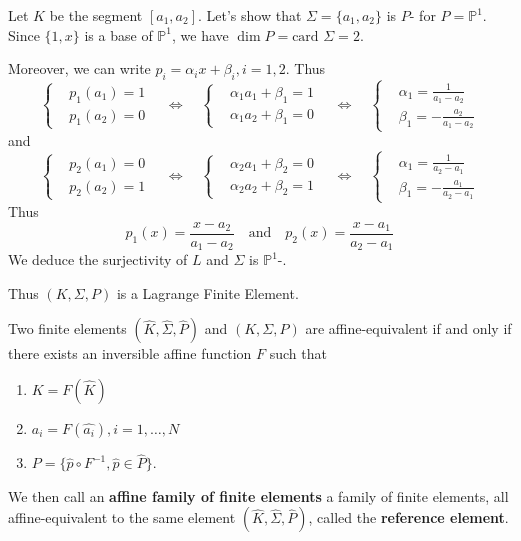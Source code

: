 \begin{Example}
	Let $K$ be the segment $[a_1,a_2]$. Let's show that $\Sigma=\{a_1,a_2\}$ is $P$- for $P=\mathbb{P}^1$. Since $\{1,x\}$ is a base of $\mathbb{P}^1$, we have $\dim P = \text{card } \Sigma = 2$. 
	
	Moreover, we can write $p_i=\alpha_i x+\beta_i, i=1,2$. Thus
	\begin{equation*}
		\left\{\begin{aligned}
			&p_1(a_1)=1 \\
			&p_1(a_2)=0
		\end{aligned}\right. \quad \iff	\quad
		\left\{\begin{aligned}
			&\alpha_1 a_1+\beta_1=1 \\
			&\alpha_1 a_2+\beta_1=0
		\end{aligned}\right. \quad \iff \quad
		\left\{\begin{aligned}
		&\alpha_1 = \frac{1}{a_1-a_2} \\
		&\beta_1 = -\frac{a_2}{a_1-a_2}
	\end{aligned}\right.
	\end{equation*}
	and
	\begin{equation*}
		\left\{\begin{aligned}
			&p_2(a_1)=0 \\
			&p_2(a_2)=1
		\end{aligned}\right. \quad \iff	\quad
		\left\{\begin{aligned}
			&\alpha_2 a_1+\beta_2=0 \\
			&\alpha_2 a_2+\beta_2=1
		\end{aligned}\right. \quad \iff \quad
		\left\{\begin{aligned}
			&\alpha_1 = \frac{1}{a_2-a_1} \\
			&\beta_1 = -\frac{a_1}{a_2-a_1}
		\end{aligned}\right.
	\end{equation*}
	Thus
	\begin{equation*}
		p_1(x)=\frac{x-a_2}{a_1-a_2} \quad \text{and} \quad p_2(x)=\frac{x-a_1}{a_2-a_1}
	\end{equation*}
	We deduce the surjectivity of $L$ and $\Sigma$ is $\mathbb{P}^1$-. 
	
	Thus $(K,\Sigma,P)$ is a Lagrange Finite Element.
	\end{Example}

	\begin{Def}
		Two finite elements $(\hat{K},\hat{\Sigma},\hat{P})$ and $(K,\Sigma,P)$ are affine-equivalent if and only if there exists an inversible affine function $F$ such that
		\begin{enumerate}[label=\textbullet]
			\item $K=F(\hat{K})$
			\item $a_i=F(\hat{a_i}),i=1,\dots,N$ 
			\item $P=\{\hat{p}\circ F^{-1},\hat{p}\in\hat{P}\}$.
		\end{enumerate}
		We then call an \textbf{affine family of finite elements} a family of finite elements, all affine-equivalent to the same element $(\hat{K},\hat{\Sigma},\hat{P})$, called the \textbf{reference element}.
	\end{Def}

